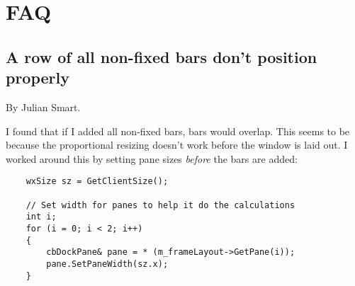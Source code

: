 \section{FAQ}\label{faq}

\subsection{A row of all non-fixed bars don't position properly}

By Julian Smart.

I found that if I added all non-fixed bars, bars would overlap.
This seems to be because the proportional resizing doesn't work
before the window is laid out. I worked around this by setting
pane sizes {\it before} the bars are added:

\begin{verbatim}
    wxSize sz = GetClientSize();

    // Set width for panes to help it do the calculations
    int i;
    for (i = 0; i < 2; i++)
    {
        cbDockPane& pane = * (m_frameLayout->GetPane(i));
        pane.SetPaneWidth(sz.x);
    }
\end{verbatim}

